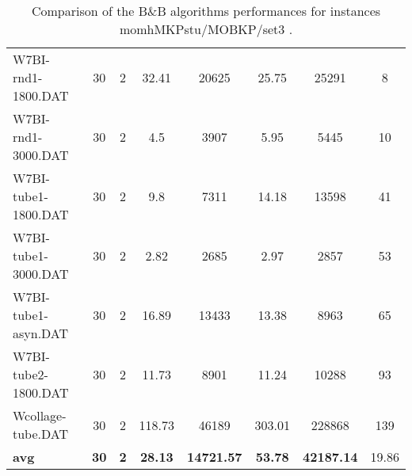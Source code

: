 \begin{table}[!ht]
{\begin{tabular}{lccccccc}
W7BI-rnd1-1800.DAT & 30 & 2 & 32.41 & 20625 &  \textcolor{blue2}{25.75} & 25291 & 8 \\
W7BI-rnd1-3000.DAT & 30 & 2 &  \textcolor{blue2}{4.5} & 3907 & 5.95 & 5445 & 10 \\
W7BI-tube1-1800.DAT & 30 & 2 &  \textcolor{blue2}{9.8} & 7311 & 14.18 & 13598 & 41 \\
W7BI-tube1-3000.DAT & 30 & 2 &  \textcolor{blue2}{2.82} & 2685 & 2.97 & 2857 & 53 \\
W7BI-tube1-asyn.DAT & 30 & 2 & 16.89 & 13433 &  \textcolor{blue2}{13.38} & 8963 & 65 \\
W7BI-tube2-1800.DAT & 30 & 2 & 11.73 & 8901 &  \textcolor{blue2}{11.24} & 10288 & 93 \\
Wcollage-tube.DAT & 30 & 2 &  \textcolor{blue2}{118.73} & 46189 & 303.01 & 228868 & 139 \\
\cline{1-8} \textbf{avg} & \textbf{30} & \textbf{2} & \textbf{28.13} & \textbf{14721.57} & \textbf{53.78} & \textbf{42187.14} & 19.86\\ \cline{1-8}
\bottomrule
\end{tabular}
}%
\caption{Comparison of the B\&B algorithms performances for instances momhMKPstu/MOBKP/set3 .}
\label{tab:table_compareBB_momhMKPstu/MOBKP/set3 }
\end{table}
